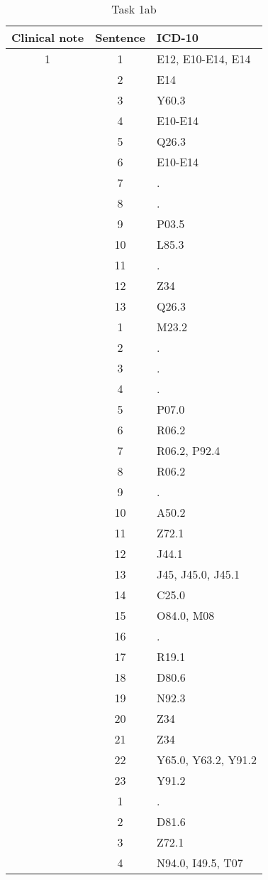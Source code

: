 \begin{table}[htbp] \footnotesize \center
\caption{Task 1ab\label{tab:task1ab}}
\begin{tabular}{c c l}
    \toprule
    Clinical note & Sentence & ICD-10 \\
    \midrule
	1 & 1 & E12, E10-E14, E14 \\
	 & 2 & E14 \\
	 & 3 & Y60.3 \\
	 & 4 & E10-E14 \\
	 & 5 & Q26.3 \\
	 & 6 & E10-E14 \\
	 & 7 & . \\
	 & 8 & . \\
	 & 9 & P03.5 \\
	 & 10 & L85.3 \\
	 & 11 & . \\
	 & 12 & Z34 \\
	 & 13 & Q26.3 \\
	\addlinespace
	2 & 1 & M23.2 \\
	 & 2 & . \\
	 & 3 & . \\
	 & 4 & . \\
	 & 5 & P07.0 \\
	 & 6 & R06.2 \\
	 & 7 & R06.2, P92.4 \\
	 & 8 & R06.2 \\
	 & 9 & . \\
	 & 10 & A50.2 \\
	 & 11 & Z72.1 \\
	 & 12 & J44.1 \\
	 & 13 & J45, J45.0, J45.1 \\
	 & 14 & C25.0 \\
	 & 15 & O84.0, M08 \\
	 & 16 & . \\
	 & 17 & R19.1 \\
	 & 18 & D80.6 \\
	 & 19 & N92.3 \\
	 & 20 & Z34 \\
	 & 21 & Z34 \\
	 & 22 & Y65.0, Y63.2, Y91.2 \\
	 & 23 & Y91.2 \\
	\addlinespace
	3 & 1 & . \\
	 & 2 & D81.6 \\
	 & 3 & Z72.1 \\
	 & 4 & N94.0, I49.5, T07 \\

\end{tabular}
\end{table}
